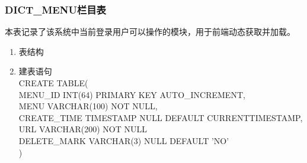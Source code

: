 \subsubsection{DICT\_MENU栏目表}
本表记录了该系统中当前登录用户可以操作的模块，用于前端动态获取并加载。
\begin{enumerate}
    \item 表结构
    \begin{table}[htbp]
        \centering
        \end{table}
    \item 建表语句\\
        CREATE TABLE(\\
            MENU\_ID INT(64) PRIMARY KEY AUTO\_INCREMENT,\\
            MENU VARCHAR(100) NOT NULL, \\
            CREATE\_TIME TIMESTAMP NULL DEFAULT CURRENTTIMESTAMP,\\
            URL VARCHAR(200) NOT NULL \\            
            DELETE\_MARK VARCHAR(3) NULL DEFAULT 'NO'\\
        )
    \end{enumerate}

